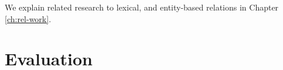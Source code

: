 We explain related research to lexical, and entity-based relations in Chapter \ref{ch:rel-work}. 




\section{Evaluation}










